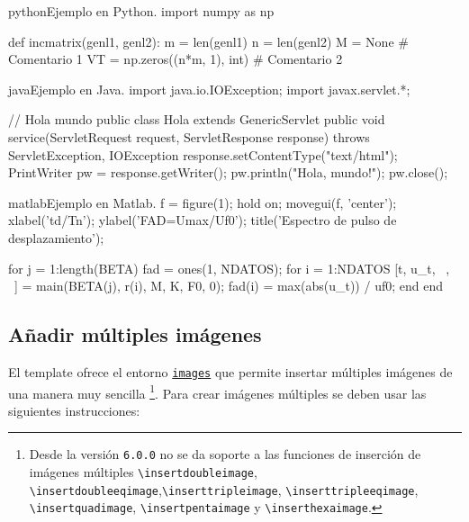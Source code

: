 \begin{sourcecode}[\label{codigo-python}]{python}{Ejemplo en Python.}
import numpy as np

def incmatrix(genl1, genl2):
	m = len(genl1)
	n = len(genl2)
	M = None # Comentario 1
	VT = np.zeros((n*m, 1), int) # Comentario 2
\end{sourcecode}

\begin{sourcecode}[\label{codigo-java}]{java}{Ejemplo en Java.}
import java.io.IOException;
import javax.servlet.*;

// Hola mundo
public class Hola extends GenericServlet {
	public void service(ServletRequest request, ServletResponse response)
	throws ServletException, IOException{
		response.setContentType("text/html");
		PrintWriter pw = response.getWriter();
		pw.println("Hola, mundo!");
		pw.close();
	}
}
\end{sourcecode}

\begin{sourcecode}[\label{codigo-matlab}]{matlab}{Ejemplo en Matlab.}
f = figure(1); hold on;
movegui(f, 'center');
xlabel('td/Tn'); ylabel('FAD=Umax/Uf0');
title('Espectro de pulso de desplazamiento');

for j = 1:length(BETA)
	fad = ones(1, NDATOS); %
	for i = 1:NDATOS
		[t, u_t, ~, ~] = main(BETA(j), r(i), M, K, F0, 0);
		fad(i) = max(abs(u_t)) / uf0;
	end
end
\end{sourcecode}

	\subsection{Añadir múltiples imágenes}

	El template ofrece el entorno \href{https://latex.ppizarror.com/informe.html#hlp-images}{\texttt{images}} que permite insertar múltiples imágenes de una manera muy sencilla \footnote{Desde la versión \texttt{6.0.0} no se da soporte a las funciones de inserción de imágenes múltiples \texttt{\textbackslash insertdoubleimage}, \texttt{\textbackslash insertdoubleeqimage},\texttt{\textbackslash inserttripleimage}, \texttt{\textbackslash inserttripleeqimage}, \texttt{\textbackslash insertquadimage}, \texttt{\textbackslash insertpentaimage} y \texttt{\textbackslash inserthexaimage}.}. Para crear imágenes múltiples se deben usar las siguientes instrucciones:

